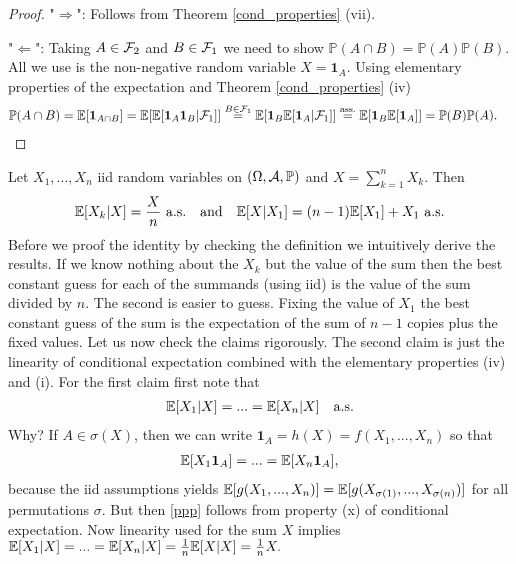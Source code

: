 \begin{proof}[Proof]
"$\Rightarrow$": Follows from Theorem \ref{cond_properties} (vii).\smallskip
	
"$\Leftarrow$": Taking $A\in \cF_2$ and $B\in \cF_1$ we need to show $\mathbb P(A\cap B)=\mathbb P(A)\mathbb P(B)$. All we use is the non-negative random variable $X=\mathbf 1_A$. Using elementary properties of the expectation and  Theorem \ref{cond_properties} (iv)
	\begin{align*}
	\mathbb{P}(A\cap B) &= \mathbb E[\mathbf 1_{A \cap B}] 
	= \mathbb E[\mathbb E[\mathbf 1_A \mathbf 1_B |\cF_1]] 
	\overset{B\in \cF_1}{=} \mathbb E[\mathbf 1_B \mathbb E[\mathbf 1_A |\cF_1]] 
	\overset{\text{ass.}}{=} \mathbb E[\mathbf 1_B \E[\mathbf 1_A]] = \mathbb{P}(B) \mathbb{P}(A).
	\end{align*}
\end{proof}

\begin{example}\label{so}
	Let $X_1,...,X_n$ iid random variables on $(\Omega, \mathcal A, \P)$ and $X=\sum_{k=1}^n X_k$. Then 
	\begin{align*}
		\E[X_k|X]=\frac X n\,\,\text{a.s.}\quad \text{and}\quad \E[X|X_1]=(n-1)\E[X_1]+X_1\,\,\text{a.s.}
	\end{align*}
	Before we proof the identity by checking the definition we intuitively derive the results. If we know nothing about the $X_k$ but the value of the sum then the best constant guess for each of the summands (using iid) is the value of the sum divided by $n$. The second is easier to guess. Fixing the value of $X_1$ the best constant guess of the sum is the expectation of the sum of $n-1$ copies plus the fixed values. Let us now check the claims rigorously. The second claim is just the linearity of conditional expectation combined with the elementary properties (iv) and (i). For the first claim first note that 
\begin{align}\label{ppp}
	\E[X_1|X]=...=\E[X_n|X]\quad \text{a.s.}
\end{align}	
	 Why? If $A\in \sigma(X)$, then we can write $\mathbf 1_A=h(X)=f(X_1,...,X_n)$ so that
	\begin{align*}
		\E[X_1\mathbf 1_A]=...=\E[X_n\mathbf 1_A],
	\end{align*}
	because the iid assumptions yields $\E[g(X_1,...,X_n)]=\E[g(X_{\sigma(1)},...,X_{\sigma(n)})]$ for all permutations $\sigma$. But then \eqref{ppp} follows from property (x) of conditional expectation. Now linearity used for the sum $X$ implies $\E[X_1|X]=...=\E[X_n|X]=\frac 1 n \E[X|X]=\frac 1 n X.$
\end{example}

